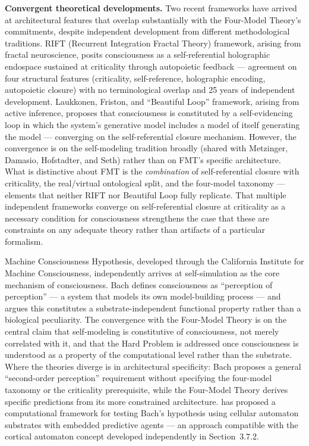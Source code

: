 \documentclass[12pt]{article}
\newcommand{\revstart}{}
\newcommand{\revend}{}
\begin{document}
{\revstart\textbf{Convergent theoretical developments.} Two recent frameworks have arrived at architectural features that overlap substantially with the Four-Model Theory's commitments, despite independent development from different methodological traditions. \citet{Bieberich2026} RIFT (Recurrent Integration Fractal Theory) framework, arising from fractal neuroscience, posits consciousness as a self-referential holographic endospace sustained at criticality through autopoietic feedback --- agreement on four structural features (criticality, self-reference, holographic encoding, autopoietic closure) with no terminological overlap and 25 years of independent development. Laukkonen, Friston, and \citet{Laukkonen2025} ``Beautiful Loop'' framework, arising from active inference, proposes that consciousness is constituted by a self-evidencing loop in which the system's generative model includes a model of itself generating the model --- converging on the self-referential closure mechanism. However, the convergence is on the self-modeling tradition broadly (shared with Metzinger, Damasio, Hofstadter, and Seth) rather than on FMT's specific architecture. What is distinctive about FMT is the \emph{combination} of self-referential closure with criticality, the real/virtual ontological split, and the four-model taxonomy --- elements that neither RIFT nor Beautiful Loop fully replicate. That multiple independent frameworks converge on self-referential closure at criticality as a necessary condition for consciousness strengthens the case that these are constraints on any adequate theory rather than artifacts of a particular formalism.\revend}

\citet{Bach2026} Machine Consciousness Hypothesis, developed through the California Institute for Machine Consciousness, independently arrives at self-simulation as the core mechanism of consciousness. Bach defines consciousness as ``perception of perception'' --- a system that models its own model-building process --- and argues this constitutes a substrate-independent functional property rather than a biological peculiarity. The convergence with the Four-Model Theory is on the central claim that self-modeling is constitutive of consciousness, not merely correlated with it, and that the Hard Problem is addressed once consciousness is understood as a property of the computational level rather than the substrate. Where the theories diverge is in architectural specificity: Bach proposes a general ``second-order perception'' requirement without specifying the four-model taxonomy or the criticality prerequisite, while the Four-Model Theory derives specific predictions from its more constrained architecture. \citet{Fitz2025} has proposed a computational framework for testing Bach's hypothesis using cellular automaton substrates with embedded predictive agents --- an approach compatible with the cortical automaton concept developed independently in Section~3.7.2.
\end{document}
